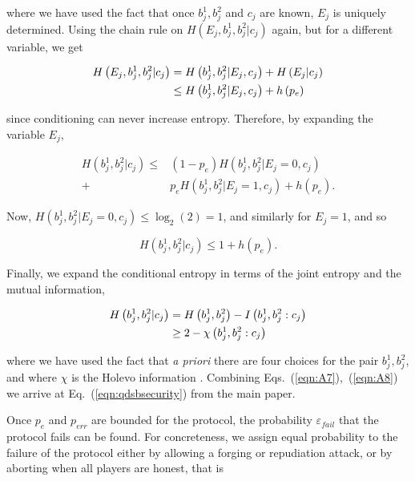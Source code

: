 \noindent where we have used the fact that once $b_j^1, b_j^2$ and $c_j$ are known, $E_j$ is uniquely determined. Using the chain rule on $H\left(E_j, b_j^1, b_j^2 | c_j\right)$ again, but for a different variable, we get

\begin{align*}
H\left(E_j, b_j^1, b_j^2 | c_j\right) &= H\left(b_j^1, b_j^2 | E_j, c_j\right) + H\left(E_j | c_j\right) \notag \\
&\le H\left(b_j^1, b_j^2 | E_j, c_j\right) + h\left(p_e\right)
\end{align*}

\noindent since conditioning can never increase entropy. Therefore, by expanding the variable $E_j$,

\begin{align*}
H\left(b_j^1, b_j^2 | c_j\right) \le &\left(1 - p_e\right) H\left(b_j^1, b_j^2 | E_j = 0, c_j\right) \\ + &p_e H \left(b_j^1, b_j^2 | E_j=1, c_j\right) + h\left(p_e\right).
\end{align*}

\noindent Now, $H\left(b_j^1, b_j^2 | E_j=0, c_j\right) \le \log_2\left(2\right) = 1$, and similarly for $E_j=1$, and so

\begin{equation}\label{eqn:A7}
H\left(b_j^1, b_j^2 | c_j\right) \le 1 + h\left(p_e\right).
\end{equation}

\noindent Finally, we expand the conditional entropy in terms of the joint entropy and the mutual information,

\begin{align}\label{eqn:A8}
H\left(b_j^1, b_j^2 | c_j\right) &= H\left(b_j^1, b_j^2\right) - I\left(b_j^1, b_j^2 : c_j\right) \notag \\
&\ge 2 - \chi\left(b_j^1, b_j^2 : c_j\right)
\end{align}

\noindent where we have used the fact that \emph{a priori} there are four choices for the pair $b_j^1, b_j^2$, and where $\chi$ is the Holevo information \cite{Nielsen2010}. Combining Eqs.~(\ref{eqn:A7}),~(\ref{eqn:A8}) we arrive at Eq.~(\ref{eqn:qdsbsecurity}) from the main paper.


Once $p_e$ and $p_{err}$ are bounded for the protocol, the probability $\varepsilon_{fail}$ that the protocol fails can be found. For concreteness, we assign equal probability to the failure of the protocol either by allowing a forging or repudiation attack, or by aborting when all players are honest, that is

